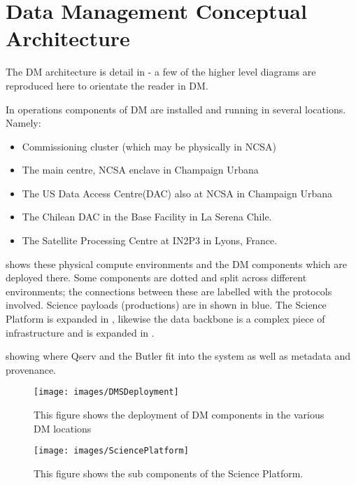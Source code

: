 \section{Data Management Conceptual Architecture} \label{sect:dmarc}

The DM architecture is detail in  - a few of the higher level diagrams are reproduced here to 
orientate the reader in DM.

In operations components of DM are installed and running in several locations. Namely:
\begin{itemize}
\item Commissioning cluster (which may be physically in NCSA)
\item The main centre, NCSA enclave in Champaign Urbana
\item The US Data Access Centre(DAC) also at NCSA in Champaign Urbana
\item The Chilean DAC in the Base Facility in La Serena Chile. 
\item The Satellite Processing Centre at IN2P3 in Lyons, France.
\end{itemize}
 shows these physical compute environments  and the DM components which are deployed there. 
 Some components are dotted and split across different
environments; the connections between these are labelled with the
protocols involved.  Science payloads (productions) are in shown in blue.
The Science Platform is expanded in , likewise the data backbone is 
a complex piece of infrastructure and is expanded in .

showing where Qserv and the Butler fit
into the system as well as metadata and provenance.




\begin{figure}[htbp]
\begin{center}
 \texttt{[image: images/DMSDeployment]}
\caption{This figure shows the deployment of DM components in the various DM locations \label{fig:dmsdeploy}}
\end{center}
\end{figure}

\begin{figure}[htbp]
\begin{center}
 \texttt{[image: images/SciencePlatform]}
\caption{This figure shows the sub components of the Science Platform. \label{fig:sciplan}}
\end{center}
\end{figure}


